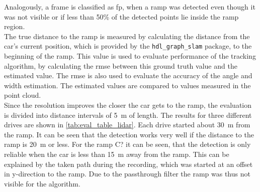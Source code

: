 Analogously, a frame is classified as \gls{fp}, when a ramp was detected even though it was not visible or if less than 50\% of the detected points lie inside the ramp region.\\
The true distance to the ramp is measured by calculating the distance from the car's current position, which is provided by the \texttt{hdl\_graph\_slam} package, to the beginning of the ramp.
This value is used to evaluate performance of the tracking algorithm, by calculating the \gls{rmse} between this ground truth value and the estimated value.
The \gls{rmse} is also used to evaluate the accuracy of the angle and width estimation.
The estimated values are compared to values measured in the point cloud.\\
Since the resolution improves the closer the car gets to the ramp, the evaluation is divided into distance intervals of \SI{5}{\metre} of length.
The results for three different drives are shown in \cref{tab:eval_table_lidar}.
Each drive started about \SI{30}{\metre} from the ramp.
It can be seen that the detection works very well if the distance to the ramp is \SI{20}{\metre} or less.
For the ramp C? it can be seen, that the detection is only reliable when the car is less than \SI{15}{\metre} away from the ramp.
This can be explained by the taken path during the recording, which was started at an offset in y-direction to the ramp.
Due to the passthrough filter the ramp was thus not visible for the algorithm.\\
